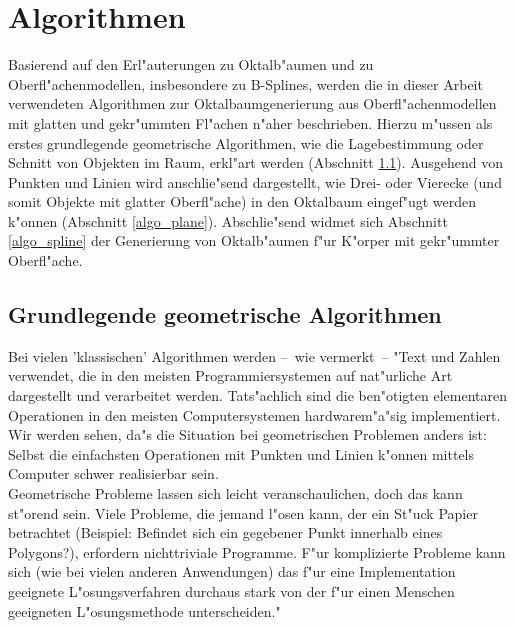 %
%

\chapter{Algorithmen}
\label{algo}
Basierend auf den Erl"auterungen zu Oktalb"aumen und zu Oberfl"achenmodellen, 
insbesondere zu B-Splines, werden die in dieser Arbeit verwendeten Algorithmen 
zur Oktalbaumgenerierung aus Oberfl"achenmodellen mit glatten und gekr"ummten 
Fl"achen n"aher beschrieben. 
Hierzu m"ussen als erstes grundlegende geometrische Algorithmen, wie die 
Lagebestimmung oder Schnitt von Objekten im Raum, erkl"art werden (Abschnitt 
\ref{algo_gl_geom}). 
Ausgehend von Punkten und Linien wird anschlie"send dargestellt, wie Drei- 
oder Vierecke (und somit Objekte mit glatter Oberfl"ache) in den Oktalbaum 
eingef"ugt werden k"onnen (Abschnitt \ref{algo_plane}). Abschlie"send widmet 
sich Abschnitt \ref{algo_spline} der Generierung von Oktalb"aumen f"ur 
K"orper mit gekr"ummter Oberfl"ache.

\section{Grundlegende geometrische Algorithmen}
\label{algo_gl_geom}
Bei vielen 'klassischen' Algorithmen werden --~wie \cite[S.399]{algo_cpp} 
vermerkt~-- "Text und Zahlen verwendet, die in den meisten Programmiersystemen 
auf nat"urliche Art dargestellt und verarbeitet werden. Tats"achlich sind 
die ben"otigten elementaren Operationen in den meisten Computersystemen 
hardwarem"a"sig implementiert. Wir werden sehen, da"s die Situation bei 
geometrischen Problemen anders ist: Selbst die einfachsten Operationen mit 
Punkten und Linien k"onnen mittels Computer schwer realisierbar sein.\\
Geometrische Probleme lassen sich leicht veranschaulichen, doch das kann 
st"orend sein. Viele Probleme, die jemand l"osen kann, der ein St"uck Papier 
betrachtet (Beispiel: Befindet sich ein gegebener Punkt innerhalb eines 
Polygons?), erfordern nichttriviale Programme. F"ur komplizierte Probleme kann 
sich (wie bei vielen anderen Anwendungen) das f"ur eine Implementation 
geeignete L"osungsverfahren durchaus stark von der f"ur einen Menschen 
geeigneten L"osungsmethode unterscheiden." 

